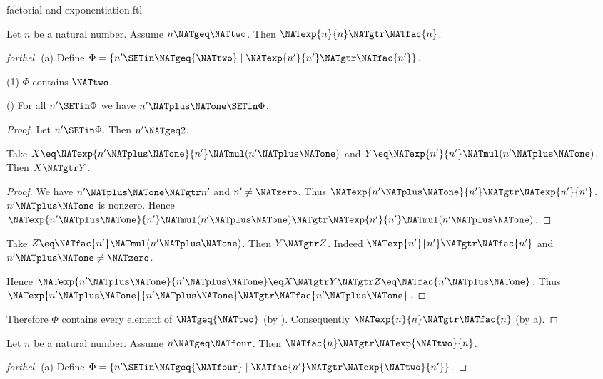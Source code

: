 \documentclass{naproche-library}
\begin{document}
\begin{smodule}[title=Factorial and Exponentiation]{factorial-and-exponentiation.ftl}

\begin{proposition}[forthel,id=ARITHMETIC_12_8113296594960384]
  Let $n$ be a natural number.
  Assume $n \NATgeq \NATtwo$.
  Then $\NATexp{n}{n} \NATgtr \NATfac{n}$.
\end{proposition}
\begin{proof}[forthel]
  (a) Define $\Phi = \{ n' \SETin \NATgeq{\NATtwo} \mid \NATexp{n'}{n'} \NATgtr \NATfac{n'} \}$.

  (1) $\Phi$ contains $\NATtwo$.

  (\NATtwo) For all $n' \SETin \Phi$ we have $n' \NATplus \NATone \SETin \Phi$.
  \begin{proof}
    Let $n' \SETin \Phi$.
    Then $n' \NATgeq 2$.

    Take $X \eq \NATexp{n' \NATplus \NATone}{n'} \NATmul (n' \NATplus \NATone)$ and $Y \eq \NATexp{n'}{n'} \NATmul (n' \NATplus \NATone)$.
    Then $X \NATgtr Y$.
    \begin{proof}
      We have $n' \NATplus \NATone \NATgtr n'$ and $n' \neq \NATzero$.
      Thus $\NATexp{n' \NATplus \NATone}{n'} \NATgtr \NATexp{n'}{n'}$.
      $n' \NATplus \NATone$ is nonzero.
      Hence $\NATexp{n' \NATplus \NATone}{n'} \NATmul (n' \NATplus \NATone) \NATgtr \NATexp{n'}{n'} \NATmul (n' \NATplus \NATone)$.
    \end{proof}

    Take $Z \eq \NATfac{n'} \NATmul (n' \NATplus \NATone)$.
    Then $Y \NATgtr Z$.
    Indeed $\NATexp{n'}{n'} \NATgtr \NATfac{n'}$ and $n' \NATplus \NATone \neq \NATzero$.

    Hence $\NATexp{n' \NATplus \NATone}{n' \NATplus \NATone} \eq X \NATgtr Y \NATgtr Z \eq \NATfac{n' \NATplus \NATone}$.
    Thus $\NATexp{n' \NATplus \NATone}{n' \NATplus \NATone} \NATgtr \NATfac{n' \NATplus \NATone}$.
  \end{proof}

  Therefore $\Phi$ contains every element of $\NATgeq{\NATtwo}$ (by ).
  Consequently $\NATexp{n}{n} \NATgtr \NATfac{n}$ (by a).
\end{proof}

\begin{proposition}[forthel,id=ARITHMETIC_12_5413271156817920]
  Let $n$ be a natural number.
  Assume $n \NATgeq \NATfour$.
  Then $\NATfac{n} \NATgtr \NATexp{\NATtwo}{n}$.
\end{proposition}
\begin{proof}[forthel]
  (a) Define $\Phi = \{ n' \SETin \NATgeq{\NATfour} \mid \NATfac{n'} \NATgtr \NATexp{\NATtwo}{n'} \}$.


\end{proof}
\end{smodule}
\end{document}
